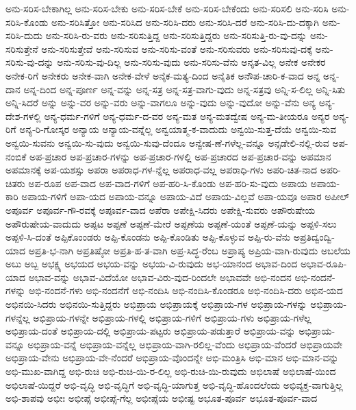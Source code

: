 {ಅನು-ಸರಿಸ-ಬೇಕಾಗಿಲ್ಲ
ಅನು-ಸರಿಸ-ಬೇಕು
ಅನು-ಸರಿಸ-ಬೇಕೆ
ಅನು-ಸರಿಸ-ಬೇಕೆಂದು
ಅನು-ಸರಿಸಲಿ
ಅನು-ಸರಿಸಿ
ಅನು-ಸರಿಸಿ-ಕೊಂಡು
ಅನು-ಸರಿಸಿತ್ತೋ
ಅನು-ಸರಿಸಿದ
ಅನು-ಸರಿಸಿ-ದರು
ಅನು-ಸರಿಸಿ-ದರೆ
ಅನು-ಸರಿಸಿ-ದು-ದಕ್ಕಾಗಿ
ಅನು-ಸರಿಸಿ-ದುದು
ಅನು-ಸರಿಸಿ-ರು-ವರು
ಅನು-ಸರಿಸುತ್ತಿದ್ದ
ಅನು-ಸರಿಸುತ್ತಿದ್ದರು
ಅನು-ಸರಿಸುತ್ತಿ-ರು-ವು-ದನ್ನು
ಅನು-ಸರಿಸುತ್ತೇನೆ
ಅನು-ಸರಿಸುತ್ತೇವೆ
ಅನು-ಸರಿಸುವ
ಅನು-ಸರಿಸು-ವಂತೆ
ಅನು-ಸರಿಸುವರು
ಅನು-ಸರಿಸುವು-ದಕ್ಕೆ
ಅನು-ಸರಿಸು-ವು-ದನ್ನು
ಅನು-ಸರಿಸು-ವು-ದಿಲ್ಲ
ಅನು-ಸರಿಸು-ವುದು
ಅನು-ಸರಿಸು-ವೆನು
ಅನೃತ-ವಿಲ್ಲ
ಅನೇಕ
ಅನೇಕರ
ಅನೇಕ-ರಿಗೆ
ಅನೇಕರು
ಅನೇಕ-ವಾಗಿ
ಅನೇಕ-ವೇಳೆ
ಅನೈಕ-ಮತ್ಯ-ದಿಂದ
ಅನೈತಿಕ
ಅನೌಪ-ಚಾರಿ-ಕ-ವಾದ
ಅನ್ನ
ಅನ್ನ-ದಾನ
ಅನ್ನ-ದಿಂದ
ಅನ್ನ-ಪೂರ್ಣ
ಅನ್ನ-ವನ್ನು
ಅನ್ನ-ಸತ್ರ
ಅನ್ನ-ಸತ್ರ-ವಾಗು-ವುದು
ಅನ್ನ-ಸತ್ರವು
ಅನ್ನಿ-ಸ-ಲಿಲ್ಲ
ಅನ್ನಿ-ಸಿತು
ಅನ್ನಿ-ಸಿದರೆ
ಅನ್ನು
ಅನ್ನು-ವರ
ಅನ್ನು-ವರು
ಅನ್ನು-ವಾಗಲೂ
ಅನ್ನು-ವುದು
ಅನ್ನು-ವುದೋ
ಅನ್ನು-ವೆನು
ಅನ್ಯ
ಅನ್ಯ-ದೇಶ-ಗಳಲ್ಲಿ
ಅನ್ಯ-ಧರ್ಮ-ಗಳಿಗೆ
ಅನ್ಯ-ಧರ್ಮ-ದ-ವರ
ಅನ್ಯ-ಮತ
ಅನ್ಯ-ಮತದ್ವೇಷ
ಅನ್ಯ-ಮ-ತೀಯರೂ
ಅನ್ಯರ
ಅನ್ಯ-ರಿಗೆ
ಅನ್ಯ-ರಿ-ಗೋಸ್ಕರ
ಅನ್ಯಾಯ
ಅನ್ಯಾಯ-ವನ್ನೆಲ್ಲ
ಅನ್ವಯಾತ್ಮ-ಕ-ವಾದುದು
ಅನ್ವಯಿ-ಸುತ್ತ-ದೆಯೆ
ಅನ್ವಯಿ-ಸುವ
ಅನ್ವಯಿ-ಸುವನು
ಅನ್ವಯಿ-ಸು-ವುದು
ಅನ್ವಯಿ-ಸುವು-ದೆಂದೂ
ಅನ್ವೇಷ-ಣೆ-ಗಳೆಲ್ಲ-ವನ್ನೂ
ಅನ್ಸಡೇಲಿ-ನಲ್ಲಿ-ರುವ
ಅಪ-ನಂಬಿಕೆ
ಅಪ-ಪ್ರಚಾರ
ಅಪ-ಪ್ರಚಾರ-ಗಳನ್ನು
ಅಪ-ಪ್ರಚಾರ-ಗಳಲ್ಲಿ
ಅಪ-ಪ್ರಚಾರದ
ಅಪ-ಪ್ರಚಾರ-ವನ್ನು
ಅಪಮಾನ
ಅಪಮಾನಕ್ಕೆ
ಅಪ-ಯಶಸ್ಸು
ಅಪರಾ
ಅಪರಾಧ-ಗಳ-ನ್ನೆಲ್ಲ
ಅಪರಾಧ-ವಲ್ಲ
ಅಪರಾಧಿ-ಗಳು
ಅಪರಿ-ಚಿತ-ನಾದ
ಅಪರಿ-ಚಿತರು
ಅಪ-ರೂಪ
ಅಪ-ವಾದ
ಅಪ-ವಾದ-ಗಳಿಗೆ
ಅಪ-ಹರಿ-ಸಿ-ಕೊಂಡು
ಅಪ-ಹರಿ-ಸು-ವುದು
ಅಪಾಯ
ಅಪಾಯ-ಕಾರಿ
ಅಪಾಯ-ಗಳಿಗೆ
ಅಪಾ-ಯದ
ಅಪಾಯ-ವನ್ನೂ
ಅಪಾಯ-ವಿದೆ
ಅಪಾಯ-ವಿಲ್ಲವೆ
ಅಪಾ-ಯವೂ
ಅಪಾರ
ಅಪೀಲ್
ಅಪೂರ್ವ
ಅಪೂರ್ವ-ಗೌ-ರವಕ್ಕೆ
ಅಪೂರ್ವ-ವಾದ
ಅಪೆರಾ
ಅಪೇಕ್ಷಿ-ಸಿದರು
ಅಪೇಕ್ಷಿ-ಸುವರು
ಅಪೌರುಷೇಯ
ಅಪೌರುಷೇಯ-ವಾದುದು
ಅಪ್ಪಟ
ಅಪ್ಪಣೆ
ಅಪ್ಪಣೆ-ಮೇರೆ
ಅಪ್ಪಣೆಯ
ಅಪ್ಪಣೆ-ಯಂತೆ
ಅಪ್ಪಣೆ-ಯನ್ನು
ಅಪ್ಪಳಿ-ಸಲು
ಅಪ್ಪಳಿ-ಸಿ-ದಂತೆ
ಅಪ್ಪಿಕೊಂಂಡರು
ಅಪ್ಪಿ-ಕೊಂಡನು
ಅಪ್ಪಿ-ಕೊಂಡಿತು
ಅಪ್ಪಿ-ಕೊಳ್ಳುವ
ಅಪ್ಪಿ-ರು-ವೆನು
ಅಪ್ರತಿದ್ವಂದ್ವಿ-ಯಾದ
ಅಪ್ರತಿ-ಭ-ನಾಗಿ
ಅಪ್ರತಿಷ್ಠೋ
ಅಪ್ರತಿ-ಹ-ತ-ವಾಗಿ
ಅಪ್ರ-ಸಿದ್ಧ-ರೆಂಬ
ಅಪ್ರಾಪ್ಯ
ಅಪ್ರಿಯ-ವಾಗಿ-ರುವುದು
ಅಬಲೆಯ
ಅಬು
ಅಬ್ಬ
ಅಭಕ್ಷ್ಯ
ಅಭಯದ
ಅಭಯ-ವನ್ನು
ಅಭಯ-ವಿ-ರುವುದು
ಅಭ-ಯಾನಂದ
ಅಭಾವ-ದಿಂದ
ಅಭಾವ-ರೂಪಿ-ಯಾದ
ಅಭಾವ-ವನ್ನು
ಅಭಾವ-ವಿದೆಯೋ
ಅಭಾವ-ವಿರು-ವುದ-ರಿಂದಲೇ
ಅಭಾವವೇ
ಅಭಿ-ನಂದನ
ಅಭಿ-ನಂದನೆ-ಗಳನ್ನು
ಅಭಿ-ನಂದನೆ-ಗಳು
ಅಭಿ-ನಂದನೆಗೆ
ಅಭಿ-ನಂದಿಸಿ
ಅಭಿ-ನಂದಿಸಿ-ಕೊಂಡರೂ
ಅಭಿ-ನಂದಿಸಿ-ದರು
ಅಭಿನ-ಯದ
ಅಭಿನಯಿ-ಸಿದರು
ಅಭಿನಯಿ-ಸುತ್ತಿದ್ದರು
ಅಭಿಪ್ರಾಯ
ಅಭಿಪ್ರಾಯಕ್ಕೆ
ಅಭಿಪ್ರಾಯ-ಗಳ
ಅಭಿಪ್ರಾಯ-ಗಳನ್ನು
ಅಭಿಪ್ರಾಯ-ಗಳನ್ನೆಲ್ಲ
ಅಭಿಪ್ರಾಯ-ಗಳನ್ನೇ
ಅಭಿಪ್ರಾಯ-ಗಳಲ್ಲಿ
ಅಭಿಪ್ರಾಯ-ಗಳಿಗೆ
ಅಭಿಪ್ರಾಯ-ಗಳು
ಅಭಿಪ್ರಾಯ-ಗಳೆಲ್ಲ
ಅಭಿಪ್ರಾಯ-ದಂತೆ
ಅಭಿಪ್ರಾಯ-ದಲ್ಲಿ
ಅಭಿಪ್ರಾಯ-ಪಟ್ಟರು
ಅಭಿಪ್ರಾಯ-ಪಡುತ್ತಾರೆ
ಅಭಿಪ್ರಾಯ-ವನ್ನು
ಅಭಿಪ್ರಾಯ-ವನ್ನೂ
ಅಭಿಪ್ರಾಯ-ವನ್ನೆ
ಅಭಿಪ್ರಾಯ-ವನ್ನೆಲ್ಲ
ಅಭಿಪ್ರಾಯ-ವಾಗಿ-ರಲಿಲ್ಲ-ವೆಂದು
ಅಭಿಪ್ರಾಯ-ವೆಂದರೆ
ಅಭಿಪ್ರಾಯವೇ
ಅಭಿಪ್ರಾಯ-ವೇನು
ಅಭಿಪ್ರಾಯ-ವೇ-ನೆಂದರೆ
ಅಭಿಪ್ರಾಯ-ವೊಂದನ್ನೇ
ಅಭಿ-ಮಂತ್ರಿಸಿ
ಅಭಿ-ಮಾನ
ಅಭಿ-ಮಾನ-ವನ್ನು
ಅಭಿ-ಮುಖ-ವಾಗಿದ್ದ
ಅಭಿ-ರುಚಿ
ಅಭಿ-ರುಚಿ-ಯಿ-ರ-ಲಿಲ್ಲ
ಅಭಿ-ರುಚಿ-ಯಿ-ರುವುದು
ಅಭಿಲಾಷೆ
ಅಭಿಲಾಷೆ-ಯಿಂದ
ಅಭಿಲಾಷೆ-ಯಿದ್ದರೆ
ಅಭಿ-ವೃದ್ಧಿ
ಅಭಿ-ವೃದ್ಧಿಗೆ
ಅಭಿ-ವೃದ್ಧಿ-ಯಾಗುತ್ತ
ಅಭಿ-ವೃದ್ಧಿ-ಹೊಂದಲೆಂದು
ಅಭಿವ್ಯಕ್ತ-ವಾಗುತ್ತಿಲ್ಲ
ಅಭಿ-ಶಾಪವು
ಅಭೀಃ
ಅಭೀಪ್ಸೆ
ಅಭೀಪ್ಸೆ-ಗೆಲ್ಲ
ಅಭೀಪ್ಸೆಯ
ಅಭೀಷ್ಟ
ಅಭೂತ-ಪೂರ್ವ
ಅಭೂತ-ಪೂರ್ವ-ವಾದ
}
